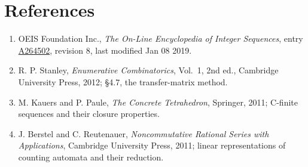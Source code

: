 \documentclass[11pt]{article}
\theoremstyle{definition}
\begin{document}
\section{References}

\begin{enumerate}

\item OEIS Foundation Inc., \emph{The On-Line Encyclopedia of Integer Sequences}, entry \href{https://oeis.org/A264502}{A264502}, revision 8, last modified Jan 08 2019.

\item R. P. Stanley, \emph{Enumerative Combinatorics}, Vol.~1, 2nd ed., Cambridge University Press, 2012; \S4.7, the transfer-matrix method.

\item M. Kauers and P. Paule, \emph{The Concrete Tetrahedron}, Springer, 2011; C-finite sequences and their closure properties.

\item J. Berstel and C. Reutenauer, \emph{Noncommutative Rational Series with Applications}, Cambridge University Press, 2011; linear representations of counting automata and their reduction.

\end{enumerate}
\end{document}
